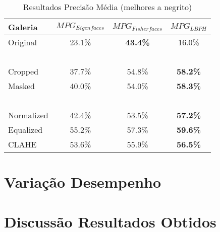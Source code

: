 \begin{center}
\begin{table}
    \begin{center}
    \caption{Resultados Precisão Média (melhores a negrito)}
    \begin{tabular}{l|ccc}
    Galeria    & $MPG_{Eigenfaces}$ & $MPG_{Fisherfaces}$ & $MPG_{LBPH}$ \\ 
    \hline\hline
    Original   & 23.1\%          & \textbf{43.4\%}  & 16.0\%             \\
    ~ \\
    Cropped    & 37.7\%          & 54.8\%           & \textbf{58.2\%}    \\
    Masked     & 40.0\%          & 54.0\%           & \textbf{58.3\%}    \\
    ~ \\
    Normalized & 42.4\%          & 53.5\%           & \textbf{57.2\%}    \\
    Equalized  & 55.2\%          & 57.3\%           & \textbf{59.6\%}    \\
    CLAHE      & 53.6\%          & 55.9\%           & \textbf{56.5\%}    \\
    \hline\hline
    \end{tabular}
    \label{tab:resultadosprecicao}
    \end{center}
\end{table}
\end{center}


\section{Variação Desempenho} \label{sec:variacaodesempenho}

\section{Discussão Resultados Obtidos} \label{sec:discussao}
